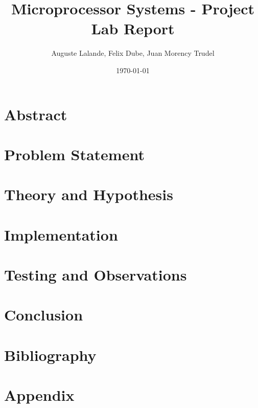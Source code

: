 \documentclass[12pt]{article}
\title{Microprocessor Systems - Project Lab Report}
\author{Auguste Lalande, Felix Dube, Juan Morency Trudel}
\date{\today}
\begin{document}
\maketitle
\clearpage

\tableofcontents
\clearpage

\section{Abstract}

\section{Problem Statement}

\section{Theory and Hypothesis}

\section{Implementation}

\section{Testing and Observations}

\section{Conclusion}

\newpage
\section{Bibliography}

%

\newpage
\section{Appendix}
\end{document}
